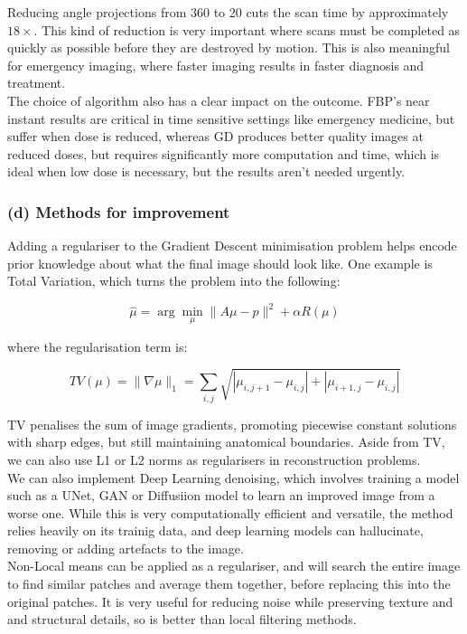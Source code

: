 \documentclass[11pt, a4paper]{article}
\begin{document}
\noindent Reducing angle projections from 360 to 20 cuts the scan time by approximately $18\times$. 
This kind of reduction is very important where scans must be completed as quickly as possible before they are destroyed by motion. 
This is also meaningful for emergency imaging, where faster imaging results in faster diagnosis and treatment.  \\

\noindent The choice of algorithm also has a clear impact on the outcome. 
FBP's near instant results are critical in time sensitive settings like emergency medicine, but suffer when dose is reduced, whereas GD produces better quality images at reduced doses, but requires significantly more computation and time, which is ideal when low dose is necessary, but the results aren't needed urgently.\\

\subsubsection*{(d) Methods for improvement}

\noindent Adding a regulariser to the Gradient Descent minimisation problem helps encode prior knowledge about what the final image should look like. 
One example is Total Variation, which turns the problem into the following:

$$\hat{\mu} = \arg\min_\mu \|A\mu - p\|^2 + \alpha R(\mu)$$

\noindent where the regularisation term is:

$$TV(\mu) = \|\nabla\mu\|_1 = \sum_{i,j} \sqrt{|\mu_{i,j+1} - \mu_{i,j}| + |\mu_{i+1,j} - \mu_{i,j}|}$$

\noindent TV penalises the sum of image gradients, promoting piecewise constant solutions with sharp edges, but still maintaining anatomical boundaries. 
Aside from TV, we can also use L1 or L2 norms as regularisers in reconstruction problems. \\

\noindent We can also implement Deep Learning denoising, which involves training a model such as a UNet, GAN or Diffusiion model to learn an improved image from a worse one. 
While this is very computationally efficient and versatile, the method relies heavily on its trainig data, and deep learning models can hallucinate, removing or adding artefacts to the image. \\

\noindent Non-Local means can be applied as a regulariser, and will search the entire image to find similar patches and average them together, before replacing this into the original patches. 
It is very useful for reducing noise while preserving texture and and structural details, so is better than local filtering methods.\\
\end{document}

